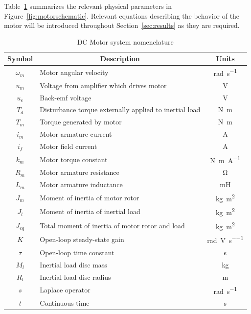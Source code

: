 Table~\ref{table:nomenclature} summarizes the relevant physical parameters in Figure~\ref{fig:motorschematic}.
Relevant equations describing the behavior of the motor will be introduced throughout Section~\ref{sec:results} as they are required.
\begin{table}[htpb]
  \centering
  \caption{DC Motor system nomenclature}
  \label{table:nomenclature}
  \begin{tabular}{@{}clc@{}}
    \toprule
    Symbol & \multicolumn{1}{c}{Description} & Units \\
    \midrule
    $\omega_m$ & Motor angular velocity & \si{\radian\per\second} \\
    $u_m$ & Voltage from amplifier which drives motor & \si{\volt} \\
    $u_e$ & Back-emf voltage & \si{\volt} \\
    $T_d$ & Disturbance torque externally applied to inertial load & \si{\newton\meter} \\
    $T_m$ & Torque generated by motor & \si{\newton\meter} \\
    $i_m$ & Motor armature current & \si{\ampere} \\
    $i_f$ & Motor field current & \si{\ampere} \\
    $k_m$ & Motor torque constant & \si{\newton\meter\per\ampere} \\
    $R_m$ & Motor armature resistance & \si{\ohm} \\
    $L_m$ & Motor armature inductance & \si{\milli\henry} \\
    $J_m$ & Moment of inertia of motor rotor & \si{\kilogram\square\meter} \\
    $J_l$ & Moment of inertia of inertial load & \si{\kilogram\square\meter} \\
    $J_{eq}$ & Total moment of inertia of motor rotor and load & \si{\kilogram\square\meter} \\
    $K$ & Open-loop steady-state gain & \si{\radian\per\volt\per\second} \\
    $\tau$ & Open-loop time constant & \si{\second} \\
    $M_l$ & Inertial load disc mass & \si{\kilogram} \\
    $R_l$ & Inertial load disc radius & \si{\meter} \\
    $s$ & Laplace operator & \si{\radian\per\second} \\
    $t$ & Continuous time & \si{\second} \\
    \bottomrule
  \end{tabular}
\end{table}


